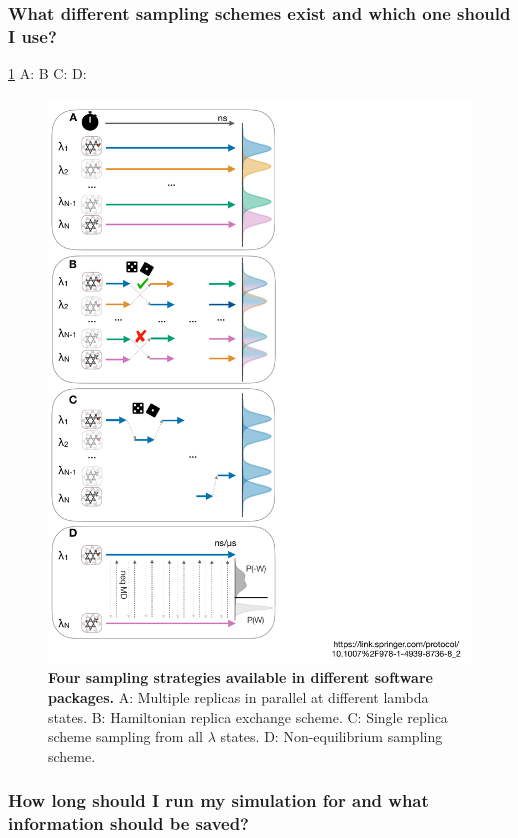 \documentclass[9pt,bestpractices]{livecoms}
\begin{document}
\subsubsection{What different sampling schemes exist and which one should I use?}
\ref{fig:fig_sampling_scheme} A:\cite{hedges2019biosimspace, song2019using } B\cite{aldeghi2015accurate, wang2015accurate,jiang2019computing} C:\cite{li2007simulated, tan2017optimally} D:\cite{aldeghi2018accurate}
\begin{figure}
    \includegraphics[width=0.95\columnwidth]{figures/fig8_sampl_scheme/Figure.pdf}
    \caption{\textbf{Four sampling strategies available in different software packages.} A: Multiple replicas in parallel at different lambda states. B: Hamiltonian replica exchange scheme. C: Single replica scheme sampling from all $\lambda$ states. D: Non-equilibrium sampling scheme.}
    \label{fig:fig_sampling_scheme}
\end{figure} 


\subsubsection{How long should I run my simulation for and what information should be saved?}
\end{document}
